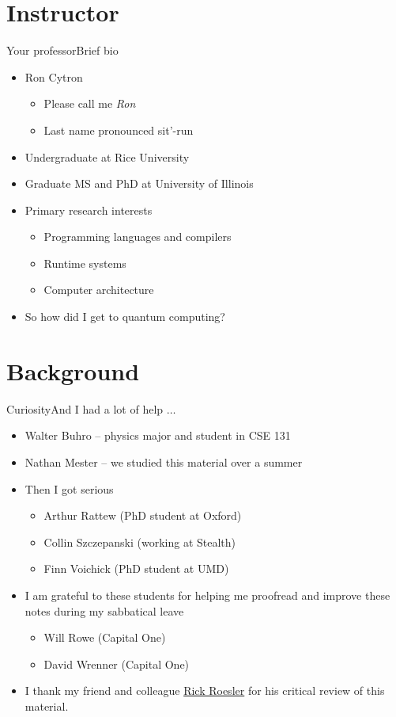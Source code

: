 \section{Instructor}
\begin{frame}{Your professor}{Brief bio}
\begin{itemize}
    \item Ron Cytron
    \begin{itemize}
        \item Please call me \emph{Ron}
        \item Last name pronounced sit'-run
    \end{itemize}
    \item Undergraduate at Rice University
    \item Graduate MS and PhD at University of Illinois
    \item Primary research interests
    \begin{itemize}
        \item Programming languages and compilers
        \item Runtime systems
        \item Computer architecture
    \end{itemize}
    \item So how did I get to quantum computing?
\end{itemize}
    
\end{frame}

\section{Background}
\begin{frame}{Curiosity}{And I had a lot of help $\ldots$}
\begin{itemize}
    \item Walter Buhro -- physics major and student in CSE 131
    \item Nathan Mester -- we studied this material over a summer
    \item Then I got serious
    \begin{itemize}
        \item Arthur Rattew (PhD student at Oxford)
        \item Collin Szczepanski (working at Stealth)
        \item Finn Voichick (PhD student at UMD)
    \end{itemize}
    \item I am grateful to these students for helping me proofread and improve these notes during my sabbatical leave
    \begin{itemize}
        \item Will Rowe (Capital One)
        \item David Wrenner (Capital One)
    \end{itemize}
    \item I thank my friend and colleague \href{https://www.linkedin.com/in/rickroesler/}{Rick Roesler} for his critical review of this material.
\end{itemize}
    
\end{frame}

